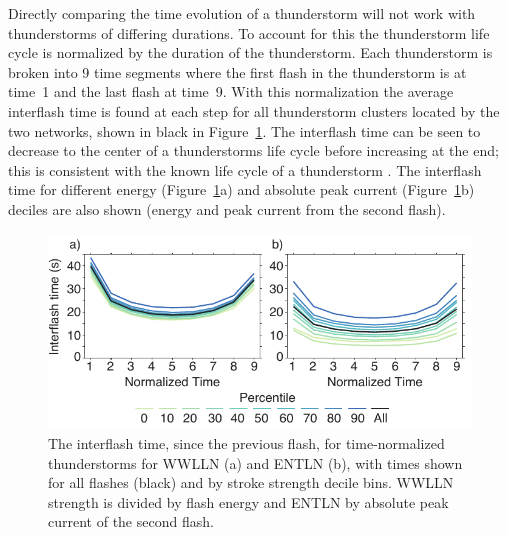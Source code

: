 Directly comparing the time evolution of a thunderstorm will not work with thunderstorms of differing durations.
To account for this the thunderstorm life cycle is normalized by the duration of the thunderstorm.
Each thunderstorm is broken into 9 time segments where the first flash in the thunderstorm is at time~1 and the last flash at time~9.
With this normalization the average interflash time is found at each step for all thunderstorm clusters located by the two networks, shown in black in Figure~\ref{thunderstorm:fig:timerate}.
The interflash time can be seen to decrease to the center of a thunderstorms life cycle before increasing at the end; this is consistent with the known life cycle of a thunderstorm \citep{Peckham1984,Rakov2003}.
The interflash time for different energy (Figure~\ref{thunderstorm:fig:timerate}a) and absolute peak current (Figure~\ref{thunderstorm:fig:timerate}b) deciles are also shown (energy and peak current from the second flash).

\begin{figure}[ht!]
   \centering
   \includegraphics[scale=1]{thunderstorm/Figures/stormTimeRate.pdf}
   \caption{The interflash time, since the previous flash, for time-normalized thunderstorms for WWLLN (a) and ENTLN (b), with times shown for all flashes (black) and by stroke strength decile bins.
     WWLLN strength is divided by flash energy and ENTLN by absolute peak current of the second flash.}
   \label{thunderstorm:fig:timerate}
\end{figure}

